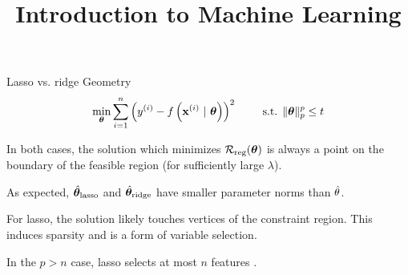 \documentclass[11pt,compress,t,notes=noshow, xcolor=table]{beamer}
\title{Introduction to Machine Learning}
\date{}
\begin{document}
 

\begin{vbframe}{Lasso vs. ridge Geometry}
$$ 
  \min_{\bm{\theta}} \sum\limits_{i=1}^n \left(y^{(i)} - f\left(\mathbf{x}^{(i)} ~|~ \bm{\theta}\right)\right)^2 \qquad \text{ s.t. } \|\bm{\theta}\|_p^p  \leq t 
$$ 
  \vspace{-0.5cm}
  \begin{figure}
    \centering
  \end{figure}

  \begin{itemize}
    \item \small{In both cases, the solution which minimizes $\mathcal{R}_{\text{reg}}(\bm{\theta})$ is always a point on the boundary of the feasible region (for sufficiently large $\lambda$).
    \item As expected, $\hat{\bm{\theta}}_{\text{lasso}}$ and $\hat{\bm{\theta}}_{\text{ridge}}$ have smaller parameter norms than $\hat{\theta}$.}
    \item For lasso, the solution likely touches vertices of the constraint region. This induces sparsity and is a form of variable selection.
    \item In the $p>n$ case, lasso selects at most $n$ features .
    
  \end{itemize}
  
\end{vbframe}
\end{document}
